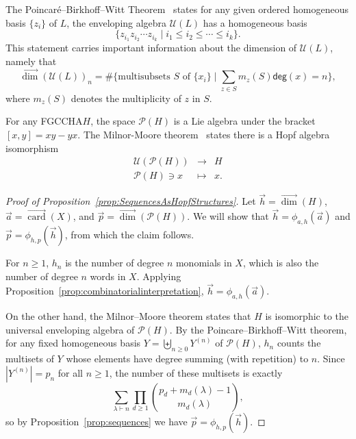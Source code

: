 \documentclass[11pt]{amsart}
\theoremstyle{definition}
\numberwithin{equation}{section}
\newcommand{\FGCCHA}{\textsf{FGCCHA}\xspace}
\newcommand{\vecdim}{\overrightarrow{\dim}}
\newcommand{\veccard}{\overrightarrow{\operatorname{card}}}
\begin{document}
The Poincar\'{e}--Birkhoff--Witt Theorem~\cite[\S 0.1]{Reutenauer-FreeLieAlgebras}
states for any given ordered homogeneous basis $\{z_i\}$ of $L$,
the enveloping algebra $\mathcal{U}(L)$ has a homogeneous basis
\[
\{ z_{i_1}z_{i_2}\cdots z_{i_k} \;|\; i_1 \leq i_2 \leq \cdots \leq i_k\}.
\]
This statement carries important information about the dimension of $\mathcal{U}(L)$, namely that 
\[
\vecdim(\mathcal{U}(L))_{n}= \#\{\text{multisubsets $S$ of $\{x_{i}\}$} \;|\; \sum_{z \in S} m_{z}(S) \mathsf{deg}(x) = n\},
\]
where $m_{z}(S)$ denotes the multiplicity of $z$ in $S$.

For any \FGCCHA $H$, the space $\mathcal{P}(H)$ is a Lie algebra under the bracket $[x, y] = xy - yx$.  
The Milnor-Moore theorem~\cite[Theorem 5.18]{MM65} states there is a Hopf algebra isomorphism
\[
\begin{array}{rcl}
\mathcal{U}(\mathcal{P}(H)) &\to& H \\
\mathcal{P}(H) \ni x & \mapsto&  x.
\end{array}
\]

\begin{proof}[Proof of Proposition~\ref{prop:SequencesAsHopfStructures}]
Let $\vec{h} = \vecdim(H)$, $\vec{a} = \veccard(X)$, and $\vec{p} = \vecdim(\mathcal{P}(H))$.  We will show that $\vec{h} = \phi_{a, h}(\vec{a})$ and $\vec{p} = \phi_{h, p}(\vec{h})$, from which the claim follows.  

For $n \ge 1$, $h_{n}$ is the number of degree $n$ monomials in $X$, which is also the number of degree $n$ words in $X$.  
Applying Proposition~\ref{prop:combinatorialinterpretation}, $\vec{h} = \phi_{a, h}(\vec{a})$.

On the other hand, the Milnor--Moore theorem states that $H$ is
isomorphic to the universal enveloping algebra of $\mathcal{P}(H)$.
By the Poincare--Birkhoff--Witt theorem, for any fixed homogeneous basis
$Y = \biguplus_{n \ge 0} Y^{(n)}$ of $\mathcal{P}(H)$, $h_{n}$ counts
the multisets of $Y$ whose elements have degree summing (with repetition)
to $n$.  Since $|Y^{(n)}| = p_{n}$ for all $n \ge 1$, the number of these
multisets is exactly
\[
\sum_{\lambda \vdash n} \prod_{d \geq 1} \binom{p_d + m_d(\lambda) -1}{m_d(\lambda)},
\]
so by Proposition~\ref{prop:sequences} we have $\vec{p} = \phi_{h, p}(\vec{h})$.
\end{proof}
\end{document}

